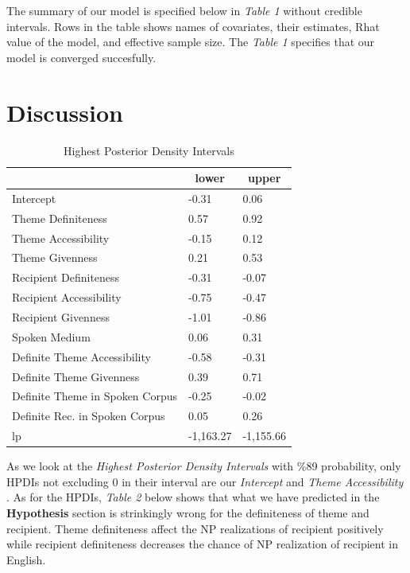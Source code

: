 \documentclass[english,floatsintext,man]{apa6}
\theoremstyle{definition}
\theoremstyle{definition}
\theoremstyle{definition}
\theoremstyle{remark}
\begin{document}
The summary of our model is specified below in \emph{Table 1} without
credible intervals. Rows in the table shows names of covariates, their
estimates, Rhat value of the model, and effective sample size. The
\emph{Table 1} specifies that our model is converged succesfully.

\section{Discussion}\label{discussion}

\begin{table}[tbp]
\begin{center}
\begin{threeparttable}
\caption{\label{tab:discuss hpdis}Highest Posterior Density Intervals}
\begin{tabular}{lll}
\toprule
 & \multicolumn{1}{c}{lower} & \multicolumn{1}{c}{upper}\\
\midrule
Intercept & -0.31 & 0.06\\
Theme Definiteness & 0.57 & 0.92\\
Theme Accessibility & -0.15 & 0.12\\
Theme Givenness & 0.21 & 0.53\\
Recipient Definiteness & -0.31 & -0.07\\
Recipient Accessibility & -0.75 & -0.47\\
Recipient Givenness & -1.01 & -0.86\\
Spoken Medium & 0.06 & 0.31\\
Definite Theme Accessibility & -0.58 & -0.31\\
Definite Theme Givenness & 0.39 & 0.71\\
Definite Theme in Spoken Corpus & -0.25 & -0.02\\
Definite Rec. in Spoken Corpus & 0.05 & 0.26\\
lp & -1,163.27 & -1,155.66\\
\bottomrule
\end{tabular}
\end{threeparttable}
\end{center}
\end{table}

As we look at the \emph{Highest Posterior Density Intervals} with \%89
probability, only HPDIs not excluding 0 in their interval are our
\emph{Intercept} and \emph{Theme Accessibility} . As for the HPDIs,
\emph{Table 2} below shows that what we have predicted in the
\textbf{Hypothesis} section is strinkingly wrong for the definiteness of
theme and recipient. Theme definiteness affect the NP realizations of
recipient positively while recipient definiteness decreases the chance
of NP realization of recipient in English.
\end{document}

